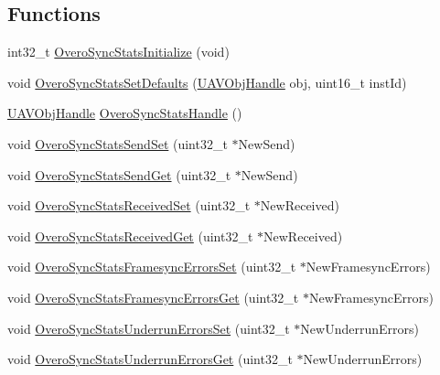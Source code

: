\subsection*{\-Functions}
\begin{DoxyCompactItemize}
\item 
int32\-\_\-t \hyperlink{group___overo_sync_stats_ga87c53a133b06c7ae4f7e84cbf3002b9c}{\-Overo\-Sync\-Stats\-Initialize} (void)
\item 
void \hyperlink{group___overo_sync_stats_ga50f6229a17e0a5fabd1285b1027647ea}{\-Overo\-Sync\-Stats\-Set\-Defaults} (\hyperlink{targets_2_u_a_v_objects_2inc_2uavobjectmanager_8h_a279053e22be53ce9f895043aaeb91e3b}{\-U\-A\-V\-Obj\-Handle} obj, uint16\-\_\-t inst\-Id)
\item 
\hyperlink{targets_2_u_a_v_objects_2inc_2uavobjectmanager_8h_a279053e22be53ce9f895043aaeb91e3b}{\-U\-A\-V\-Obj\-Handle} \hyperlink{group___overo_sync_stats_gadaf24670cf0f298ea58c42cc7d6ddb36}{\-Overo\-Sync\-Stats\-Handle} ()
\item 
void \hyperlink{group___overo_sync_stats_ga59679df9f544de883dfaf070dcede3e8}{\-Overo\-Sync\-Stats\-Send\-Set} (uint32\-\_\-t $\ast$\-New\-Send)
\item 
void \hyperlink{group___overo_sync_stats_ga4f3dfb5c6dbf35c1d70238152a3c92af}{\-Overo\-Sync\-Stats\-Send\-Get} (uint32\-\_\-t $\ast$\-New\-Send)
\item 
void \hyperlink{group___overo_sync_stats_ga9834d903d1c99c0256d19cf490ba4c20}{\-Overo\-Sync\-Stats\-Received\-Set} (uint32\-\_\-t $\ast$\-New\-Received)
\item 
void \hyperlink{group___overo_sync_stats_ga76be90d66f075c29c14a9a5b9bfddf31}{\-Overo\-Sync\-Stats\-Received\-Get} (uint32\-\_\-t $\ast$\-New\-Received)
\item 
void \hyperlink{group___overo_sync_stats_gacb21f0aa8b6ee06914d90608abe7c726}{\-Overo\-Sync\-Stats\-Framesync\-Errors\-Set} (uint32\-\_\-t $\ast$\-New\-Framesync\-Errors)
\item 
void \hyperlink{group___overo_sync_stats_ga047bab848bba507b311e854cdc253601}{\-Overo\-Sync\-Stats\-Framesync\-Errors\-Get} (uint32\-\_\-t $\ast$\-New\-Framesync\-Errors)
\item 
void \hyperlink{group___overo_sync_stats_ga90f3e4fe537ec9c554e481670847b591}{\-Overo\-Sync\-Stats\-Underrun\-Errors\-Set} (uint32\-\_\-t $\ast$\-New\-Underrun\-Errors)
\item 
void \hyperlink{group___overo_sync_stats_ga752d6f1b77cbdba418c5216b48f4739a}{\-Overo\-Sync\-Stats\-Underrun\-Errors\-Get} (uint32\-\_\-t $\ast$\-New\-Underrun\-Errors)

\end{DoxyCompactItemize}
